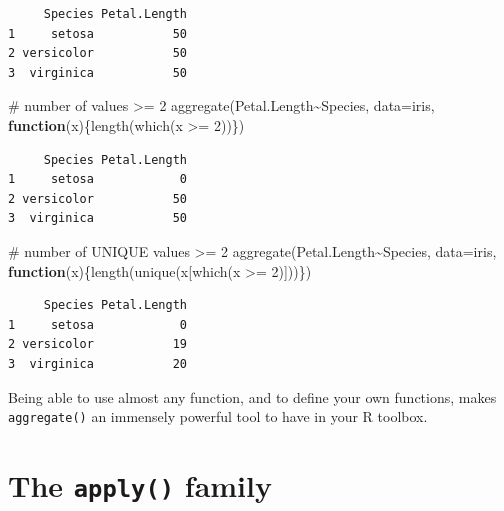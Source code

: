 \documentclass[
  13,
  letterpaper,
]{report}
\newenvironment{Shaded}{\begin{snugshade}}{\end{snugshade}}
\newcommand{\AttributeTok}[1]{\textcolor[rgb]{0.40,0.45,0.13}{#1}}
\newcommand{\CommentTok}[1]{\textcolor[rgb]{0.37,0.37,0.37}{#1}}
\newcommand{\ControlFlowTok}[1]{\textcolor[rgb]{0.00,0.23,0.31}{\textbf{#1}}}
\newcommand{\DecValTok}[1]{\textcolor[rgb]{0.68,0.00,0.00}{#1}}
\newcommand{\FunctionTok}[1]{\textcolor[rgb]{0.28,0.35,0.67}{#1}}
\newcommand{\NormalTok}[1]{\textcolor[rgb]{0.00,0.23,0.31}{#1}}
\newcommand{\SpecialCharTok}[1]{\textcolor[rgb]{0.37,0.37,0.37}{#1}}
\begin{document}
\begin{verbatim}
     Species Petal.Length
1     setosa           50
2 versicolor           50
3  virginica           50
\end{verbatim}

\begin{Shaded}
\begin{Highlighting}[]
\CommentTok{\# number of values \textgreater{}= 2}
\FunctionTok{aggregate}\NormalTok{(Petal.Length}\SpecialCharTok{\textasciitilde{}}\NormalTok{Species,}
          \AttributeTok{data=}\NormalTok{iris,}
          \ControlFlowTok{function}\NormalTok{(x)\{}\FunctionTok{length}\NormalTok{(}\FunctionTok{which}\NormalTok{(x }\SpecialCharTok{\textgreater{}=} \DecValTok{2}\NormalTok{))\})}
\end{Highlighting}
\end{Shaded}

\begin{verbatim}
     Species Petal.Length
1     setosa            0
2 versicolor           50
3  virginica           50
\end{verbatim}

\begin{Shaded}
\begin{Highlighting}[]
\CommentTok{\# number of UNIQUE values \textgreater{}= 2}
\FunctionTok{aggregate}\NormalTok{(Petal.Length}\SpecialCharTok{\textasciitilde{}}\NormalTok{Species,}
          \AttributeTok{data=}\NormalTok{iris,}
          \ControlFlowTok{function}\NormalTok{(x)\{}\FunctionTok{length}\NormalTok{(}\FunctionTok{unique}\NormalTok{(x[}\FunctionTok{which}\NormalTok{(x }\SpecialCharTok{\textgreater{}=} \DecValTok{2}\NormalTok{)]))\})}
\end{Highlighting}
\end{Shaded}

\begin{verbatim}
     Species Petal.Length
1     setosa            0
2 versicolor           19
3  virginica           20
\end{verbatim}

Being able to use almost any function, and to define your own functions,
makes \texttt{aggregate()} an immensely powerful tool to have in your R
toolbox.

\section{\texorpdfstring{The \texttt{apply()}
family}{The apply() family}}\label{the-apply-family}
\end{document}
